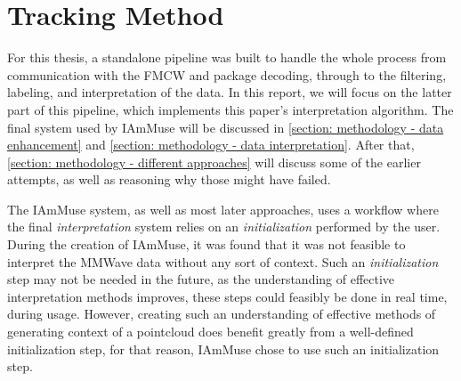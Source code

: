 \chapter{Tracking Method}
\label{chapter: tracking method}


For this thesis, a standalone pipeline was built to handle the whole process from communication with the FMCW and package decoding, through to the filtering, labeling, and interpretation of the data. 
In this report, we will focus on the latter part of this pipeline, which implements this paper's interpretation algorithm.
The final system used by IAmMuse will be discussed in \cref{section: methodology - data enhancement} and \cref{section: methodology - data interpretation}.
After that, \cref{section: methodology - different approaches} will discuss some of the earlier attempts, as well as reasoning why those might have failed.

The IAmMuse system, as well as most later approaches, uses a workflow where the final \textit{interpretation} system relies on an \textit{initialization} performed by the user.
During the creation of IAmMuse, it was found that it was not feasible to interpret the MMWave data without any sort of context.
Such an \textit{initialization} step may not be needed in the future, as the understanding of effective interpretation methods improves, these steps could feasibly be done in real time, during usage.
However, creating such an understanding of effective methods of generating context of a pointcloud does benefit greatly from a well-defined initialization step, for that reason, IAmMuse chose to use such an initialization step.
